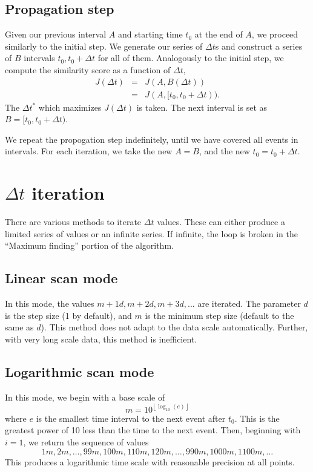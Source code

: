 \documentclass[draft]{article}
\begin{document}
\subsection{Propagation step}
\label{sec:meth-propagation}
Given our previous interval $A$ and starting time $t_0$ at the end of
$A$, we proceed similarly to the initial step.  We generate our series
of $\Delta t$s and construct a series of $B$ intervals $t_0,
t_0+\Delta t$ for all of them.  Analogously to the initial step, we
compute the similarity score as a function of $\Delta t$,
\begin{eqnarray}
  J(\Delta t) &=& J(A, B(\Delta t)) \nonumber \\
              &=& J(A,  [t_0, t_0+\Delta t)).
              \label{eq:J-max2}
\end{eqnarray}
The $\Delta t^*$ which maximizes $J(\Delta t)$ is taken.  The next
interval is set as $B = [t_0, t_0+\Delta t)$.

We repeat the propogation step indefinitely, until we have covered all
events in intervals.  For each iteration, we take the new $A = B$, and
the new $t_0 = t_0+\Delta t$.



\section{$\Delta t$ iteration}
\label{sec:meth-dt}
There are various methods to iterate $\Delta t$ values.  These can
either produce a limited series of values or an infinite series.  If
infinite, the loop is broken in the ``Maximum finding'' portion of the
algorithm.

\subsection{Linear scan mode}
In this mode, the values $m+1d, m+2d, m+3d, ...$ are iterated.  The
parameter $d$ is the step size (1 by default), and $m$ is the minimum
step size (default to the same as $d$).  This method does not adapt to
the data scale automatically.  Further, with very long scale data,
this method is inefficient.

\subsection{Logarithmic scan mode}
In this mode, we begin with a base scale of
\begin{equation}
  m = 10^{\left\lfloor \log_10(e)  \right\rfloor}
\end{equation}
where $e$ is the smallest time interval to the next event after $t_0$.
This is the greatest power of 10 less than the time to the next event.
Then, beginning with $i=1$, we return the sequence of values
\begin{equation}
  1m, 2m, \ldots, 99m, 100m, 110m, 120m, \ldots, 990m, 1000m,
  1100m, \ldots
\end{equation}
This produces a logarithmic time scale with reasonable precision at
all points.
\end{document}
